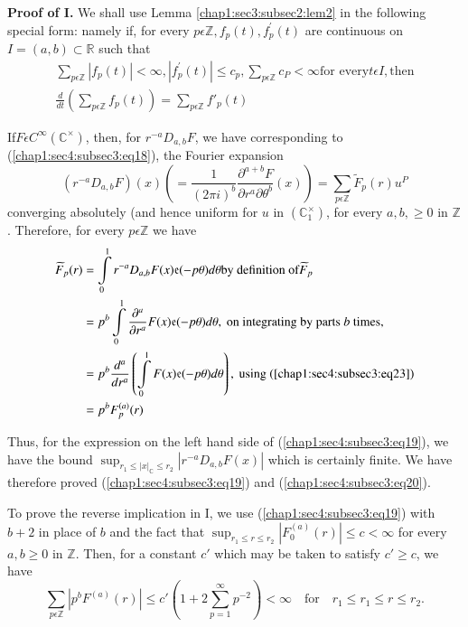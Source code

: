 \noindent \textbf{Proof of I.} We shall use
Lemma \ref{chap1:sec3:subsec2:lem2} in the following special form: 
namely if, for every $p\epsilon \mathbb{Z}, f_p(t), f_{p}^{'}(t)$ are continuous
on $I=(a,b)\subset\mathbb{R}$ such that 
\begin{gather*}
\sum\limits_{p \epsilon \mathbb{Z}}|f_{p}(t)|<\infty,|f_{p}^{'}(t)|\le
c_{p},\sum\limits_{p \epsilon \mathbb{Z}}c_{P}<\infty \text{for every}
t\epsilon I, \text{then}\\
\frac{d}{dt}\left(\sum\limits_{p\epsilon\mathbb{Z}}f_{p}(t)\right) = \sum\limits_{p
  \epsilon \mathbb{Z}}f'_{p}(t)\tag{23}\label{chap1:sec4:subsec3:eq23} 
\end{gather*}

If\pageoriginale $F\epsilon C^{\infty}({\mathbb{C}^\times})$, then, for $r^{-a}D_{a,b}F$,
   we have corresponding to (\ref{chap1:sec4:subsec3:eq18}), the Fourier expansion 
\begin{equation*}
(r^{-a}D_{a,b}F)(x)(=\frac{1}{(2\pi i)^b}\frac{\partial^{a+b}F}{\partial
    r^a \partial\theta^b}(x))=\sum\limits_{p \epsilon \mathbb{Z}}\widetilde{F}_{p}(r)u^P\tag{24}\label{chap1:sec4:subsec3:eq24} 
\end{equation*}
converging absolutely (and hence uniform for $u$ in
$(\mathbb{C}_{1}^\times)$, for every $a,b,\ge 0$ in
$\mathbb{Z}$. Therefore, for every $p\epsilon \mathbb{Z}$ we have
\begin{align*}
\widetilde{F}_{p}(r) & =\int\limits_{0}^{1}r^{-a}D_{a,b}F(x)\mathfrak{e}(-p\theta)d\theta
\text{by definition of} \widetilde{F}_{p}\\
                    &  =p^b\int\limits_{0}^{1}\frac{\partial^{a}}{\partial
    r^a}F(x)\mathfrak{e}(-p\theta)d\theta, ~\text{on integrating by
    parts}~ b ~\text{times},\\
                    &  =p^b\frac{d^a}{dr^a}\left(\int\limits_{0}^{1}F(x)
\mathfrak{e}(-p \theta)d\theta\right), ~\text{using
  (\ref{chap1:sec4:subsec3:eq23})}\\
                    &  =p^bF_{p}^{(a)}(r)
\end{align*}

Thus, for the expression on the left hand side of
(\ref{chap1:sec4:subsec3:eq19}), we have the
bound ${\displaystyle{\mathop{\sup}_{r_{1}\le{|x|}_{\mathbb{C}}\le
      r_{2}}}}|r^{-a}D_{a,b}F(x)|$ which is certainly finite. We have
therefore proved (\ref{chap1:sec4:subsec3:eq19}) and
(\ref{chap1:sec4:subsec3:eq20}). 

 To prove the reverse implication in I, we use
 (\ref{chap1:sec4:subsec3:eq19}) with $b+2$ in
 place of $b$ and the fact that
 ${\displaystyle{\mathop{\sup}_{r_{1}\le r\le
       r_{2}}}}|F_{0}^{(a)}(r)|\le c < \infty$ for every $a,b\ge 0$ in
 $\mathbb{Z}$. Then, for a constant $c'$ which may be taken to satisfy
 $c'\ge c$, we have 
\begin{equation*}
\sum\limits_{p\epsilon \mathbb{Z}}|p^bF^{(a)}(r)|\le
c'(1+2\sum\limits_{p=1}^{\infty}p^{-2})< \infty \quad \text{for}\quad r_{1}\le
r_1\le r \le r_2.
\end{equation*}


